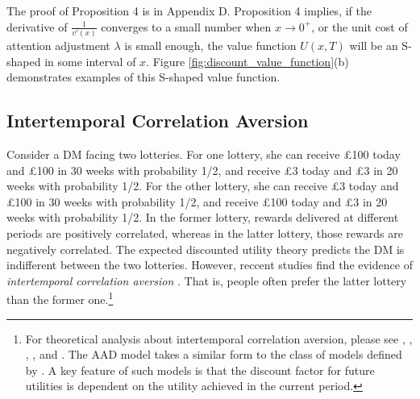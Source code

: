\documentclass[
  12pt,
]{article}
\begin{document}
The proof of Proposition 4 is in Appendix D. Proposition 4 implies, if
the derivative of \(\frac{1}{v'(x)}\) converges to a small number when
\(x\rightarrow 0^+\), or the unit cost of attention adjustment
\(\lambda\) is small enough, the value function \(U(x,T)\) will be an
S-shaped in some interval of \(x\). Figure
\ref{fig:discount_value_function}(b) demonstrates examples of this
S-shaped value function.

\hypertarget{intertemporal-correlation-aversion}{%
\subsection{Intertemporal Correlation
Aversion}\label{intertemporal-correlation-aversion}}

Consider a DM facing two lotteries. For one lottery, she can receive
£100 today and £100 in 30 weeks with probability 1/2, and receive £3
today and £3 in 20 weeks with probability 1/2. For the other lottery,
she can receive £3 today and £100 in 30 weeks with probability 1/2, and
receive £100 today and £3 in 20 weeks with probability 1/2. In the
former lottery, rewards delivered at different periods are positively
correlated, whereas in the latter lottery, those rewards are negatively
correlated. The expected discounted utility theory predicts the DM is
indifferent between the two lotteries. However, reccent studies find the
evidence of \emph{intertemporal correlation aversion}
\citep{andersen2018multiattribute, rohde2023intertemporal}. That is,
people often prefer the latter lottery than the former one.\footnote{For
  theoretical analysis about intertemporal correlation aversion, please
  see \citet{epstein1983stationary}, \citet{epstein1989substitution},
  \citet{weil1990nonexpected}, \citet{bommier2005risk}, and
  \citet{bommier2017monotone}. The AAD model takes a similar form to the
  class of models defined by \citet{epstein1983stationary}. A key
  feature of such models is that the discount factor for future
  utilities is dependent on the utility achieved in the current period.}
\end{document}
